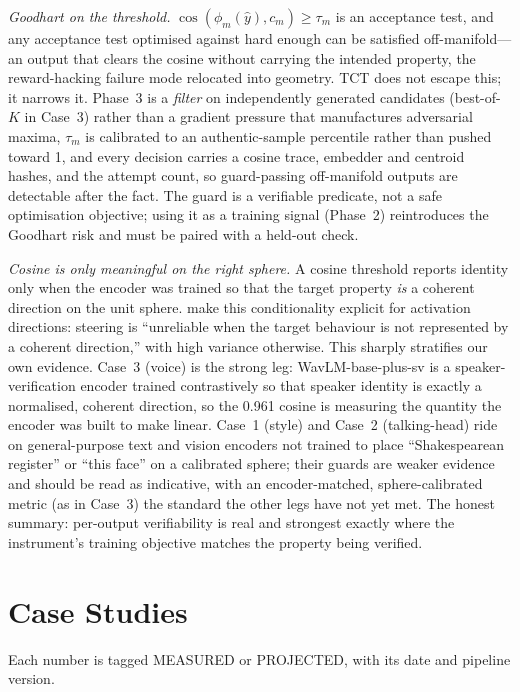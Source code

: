 \documentclass[10pt,twocolumn]{article}
\begin{document}
\emph{Goodhart on the threshold.} $\cos(\phi_m(\hat y),c_m)\ge\tau_m$ is an
acceptance test, and any acceptance test optimised against hard enough can be
satisfied off-manifold---an output that clears the cosine without carrying the
intended property, the reward-hacking failure mode relocated into geometry. TCT
does not escape this; it narrows it. Phase~3 is a \emph{filter} on independently
generated candidates (best-of-$K$ in Case~3) rather than a gradient pressure that
manufactures adversarial maxima, $\tau_m$ is calibrated to an authentic-sample
percentile rather than pushed toward 1, and every decision carries a cosine
trace, embedder and centroid hashes, and the attempt count, so guard-passing
off-manifold outputs are detectable after the fact. The guard is a verifiable
predicate, not a safe optimisation objective; using it as a training signal
(Phase~2) reintroduces the Goodhart risk and must be paired with a held-out
check.

\emph{Cosine is only meaningful on the right sphere.} A cosine threshold reports
identity only when the encoder was trained so that the target property
\emph{is} a coherent direction on the unit sphere. \citet{braun2025steering}
make this conditionality explicit for activation directions: steering is
``unreliable when the target behaviour is not represented by a coherent
direction,'' with high variance otherwise. This sharply stratifies our own
evidence. Case~3 (voice) is the strong leg: WavLM-base-plus-sv is a
speaker-verification encoder trained contrastively so that speaker identity is
exactly a normalised, coherent direction, so the 0.961 cosine is measuring the
quantity the encoder was built to make linear. Case~1 (style) and Case~2
(talking-head) ride on general-purpose text and vision encoders not trained to
place ``Shakespearean register'' or ``this face'' on a calibrated sphere; their
guards are weaker evidence and should be read as indicative, with an
encoder-matched, sphere-calibrated metric (as in Case~3) the standard the other
legs have not yet met. The honest summary: per-output verifiability is real and
strongest exactly where the instrument's training objective matches the property
being verified.

\section{Case Studies}
\label{sec:cases}
Each number is tagged MEASURED or PROJECTED, with its date and pipeline version.
\end{document}
